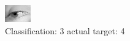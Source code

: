 \begin{figure}[h!]
\begin{center}
\includegraphics[width=0.60\columnwidth]{figures/ID2995_class_3_target_4.png}
\end{center}
\caption{ Classification: 3 actual target: 4}
\label{fig:ID2995_class_3_target_4}
\end{figure}
